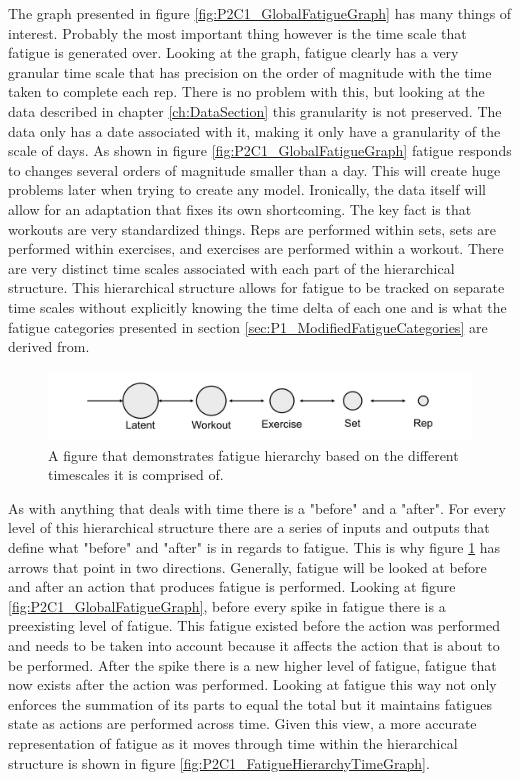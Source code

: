 The graph presented in figure \ref{fig:P2C1_GlobalFatigueGraph} has many things of interest. Probably the most important thing however is the time scale that fatigue is generated over. Looking at the graph, fatigue clearly has a very granular time scale that has precision on the order of magnitude with the time taken to complete each rep. There is no problem with this, but looking at the data described in chapter \ref{ch:DataSection} this granularity is not preserved. The data only has a date associated with it, making it only have a granularity of the scale of days. As shown in figure \ref{fig:P2C1_GlobalFatigueGraph} fatigue responds to changes several orders of magnitude smaller than a day. This will create huge problems later when trying to create any model. Ironically, the data itself will allow for an adaptation that fixes its own shortcoming. The key fact is that workouts are very standardized things. Reps are performed within sets, sets are performed within exercises, and exercises are performed within a workout. There are very distinct time scales associated with each part of the hierarchical structure. This hierarchical structure allows for fatigue to be tracked on separate time scales without explicitly knowing the time delta of each one and is what the fatigue categories presented in section \ref{sec:P1_ModifiedFatigueCategories} are derived from. 

\begin{figure}[htb]
    \centering
    \includegraphics[scale=0.55]{images/ch2/FatigueHierarchy.png}
    \caption{A figure that demonstrates fatigue hierarchy based on the different timescales it is comprised of.}
    \label{fig:P2C1_FatigueHierarchyGraph}
\end{figure}

As with anything that deals with time there is a "before" and a "after". For every level of this hierarchical structure there are a series of inputs and outputs that define what "before" and "after" is in regards to fatigue. This is why figure \ref{fig:P2C1_FatigueHierarchyGraph} has arrows that point in two directions. Generally, fatigue will be looked at before and after an action that produces fatigue is performed. Looking at figure \ref{fig:P2C1_GlobalFatigueGraph}, before every spike in fatigue there is a preexisting level of fatigue. This fatigue existed before the action was performed and needs to be taken into account because it affects the action that is about to be performed. After the spike there is a new higher level of fatigue, fatigue that now exists after the action was performed. Looking at fatigue this way not only enforces the summation of its parts to equal the total but it maintains fatigues state as actions are performed across time. Given this view, a more accurate representation of fatigue as it moves through time within the hierarchical structure is shown in figure \ref{fig:P2C1_FatigueHierarchyTimeGraph}.

